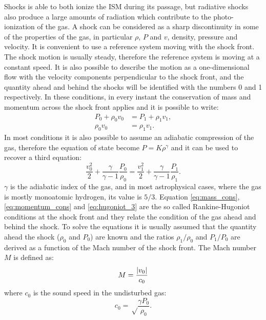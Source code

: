 \documentclass[../main.tex]{subfiles}
\begin{document}
Shocks is able to both ionize the ISM during its passage, but radiative shocks also produce a large amounts of radiation which contribute to the photo-ionization of the gas.
A shock can be considered as a sharp discontinuity in some of the properties of the gas, in particular $\rho$, $P$ and $v$, density, pressure and velocity.
It is convenient to use a reference system moving with the shock front.
The shock motion is usually steady, therefore the reference system is moving at a constant speed.
It is also possible to describe the motion as a one-dimensional flow with the velocity components perpendicular to the shock front, and the quantity ahead and behind the shocks will be identified with the numbers 0 and 1 respectively.
In these conditions, in every instant the conservation of mass and momentum across the shock front applies and it is possible to write:
\begin{align}
    \label{eq:mass_cons}
    P_0 + \rho_0 v_0 &= P_1+\rho_1 v_1,\\
    \label{eq:momentum_cons}
    \rho_0 v_0 &= \rho_1 v_1.
\end{align}
In most conditions it is also possible to assume an adiabatic compression of the gas, therefore the equation of state become $P = K \rho^{\gamma}$ and it can be used to recover a third equation:
\begin{equation}
    \label{eq:hugoniot_3}
    \frac{v^2_0}{2} + \frac{\gamma}{\gamma-1}\frac{P_0}{\rho_0} = \frac{v^2_1}{2} + \frac{\gamma}{\gamma-1}\frac{P_1}{\rho_1}.
\end{equation}
$\gamma$ is the adiabatic index of the gas, and in most astrophysical cases, where the gas is mostly monoatomic hydrogen, its value is $5/3$.
Equation \ref{eq:mass_cons}, \ref{eq:momentum_cons} and \ref{eq:hugoniot_3} are the so called Rankine-Hugoniot conditions at the shock front and they relate the condition of the gas ahead and behind the shock.
To solve the equations it is usually assumed that the quantity ahead the shock ($\rho_0$ and $P_0$) are known and the ratios $\rho_1/\rho_0$ and $P_1/P_0$ are derived as a function of the Mach number of the shock front.
The Mach number $M$ is defined as:
\begin{equation}
    \label{eq:mach}
    M = \frac{\lvert v_0\rvert}{c_0}
\end{equation}
where $c_0$ is the sound speed in the undisturbed gas:
\begin{equation}
    \label{eq:soundspeed}
    c_0 = \sqrt\frac{\gamma P_0}{\rho_0}.
\end{equation}
\end{document}
